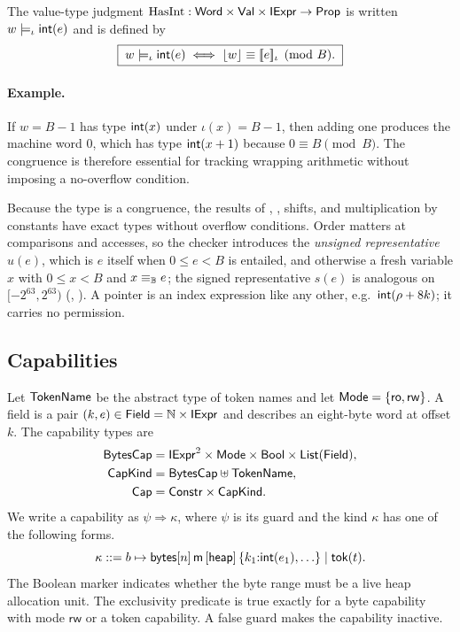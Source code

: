 \begin{definition}\label{def:hasint}
The value-type judgment $\mathrm{HasInt}:\mathsf{Word}\times\mathsf{Val}\times\mathsf{IExpr}\to\mathsf{Prop}$ is written $w\models_\iota\mathsf{int}(e)$ and is defined by
\[
\boxed{\;w\models_\iota\mathsf{int}(e)\iff\lfloor w\rfloor\equiv[\![e]\!]_{\iota}\pmod{B}.\;}
\]
\end{definition}

\paragraph{Example.} If $w=B-1$ has type $\mathsf{int}(x)$ under $\iota(x)=B-1$, then adding one produces the machine word $0$, which has type $\mathsf{int}(x+1)$ because $0\equiv B\pmod B$. The congruence is therefore essential for tracking wrapping arithmetic without imposing a no-overflow condition.


Because the type is a congruence, the results of , , shifts, and multiplication by constants have exact types without overflow conditions. Order matters at comparisons and accesses, so the checker introduces the \emph{unsigned representative} $u(e)$, which is $e$ itself when $0\le e<B$ is entailed, and otherwise a fresh variable $x$ with $0\le x<B$ and $x\equiv_{\mathbb{B}} e$; the signed representative $s(e)$ is analogous on $[-2^{63},2^{63})$ (, ). A pointer is an index expression like any other, e.g.\ $\mathsf{int}(\rho+8k)$; it carries no permission.

\subsection{Capabilities}
\begin{definition}\label{def:cap}
Let $\mathsf{TokenName}$ be the abstract type of token names and let $\mathsf{Mode}=\{\mathsf{ro},\mathsf{rw}\}$. A field is a pair $(k,e)\in\mathsf{Field}=\mathbb{N}\times\mathsf{IExpr}$ and describes an eight-byte word at offset $k$. The capability types are
\[
\begin{aligned}
\mathsf{BytesCap}&=\mathsf{IExpr}^2\times\mathsf{Mode}\times\mathsf{Bool}\times\mathsf{List}(\mathsf{Field}),\\
\mathsf{CapKind}&=\mathsf{BytesCap}\uplus\mathsf{TokenName},\\
\mathsf{Cap}&=\mathsf{Constr}\times\mathsf{CapKind}.
\end{aligned}
\]
We write a capability as $\psi\Rightarrow\kappa$, where $\psi$ is its guard and the kind $\kappa$ has one of the following forms.
\[\kappa::=b\mapsto\mathsf{bytes}[n]\,\mathsf{m}\,[\mathsf{heap}]\,\{k_1{:}\mathsf{int}(e_1),\ldots\}\mid\mathsf{tok}(t).\]
The Boolean marker indicates whether the byte range must be a live heap allocation unit. The exclusivity predicate is true exactly for a byte capability with mode $\mathsf{rw}$ or a token capability. A false guard makes the capability inactive.
\end{definition}

